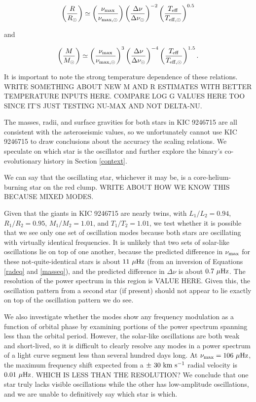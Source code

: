 \begin{equation}
\left( \frac{R}{R_\odot} \right) \simeq \left( \frac{\nu_{\rm{max}}}{\nu_{\rm{max,\odot}}} \right) \left( \frac{\Delta \nu}{\Delta \nu_\odot} \right)^{-2} \left( \frac{T_{\rm{eff}}}{T_{\rm{eff,\odot}}} \right)^{0.5}
\label{radeq}
\end{equation}

and

\begin{equation}
\left( \frac{M}{M_\odot} \right) \simeq {\left( \frac{\nu_{\rm{max}}}{\nu_{\rm{max,\odot}}} \right)}^{3} \left( \frac{\Delta \nu}{\Delta \nu_\odot} \right)^{-4} \left( \frac {T_{\rm{eff}}} {T_{\rm{eff,\odot}}} \right)^{1.5}.
\label{masseq}
\end{equation}

It is important to note the strong temperature dependence of these relations. WRITE SOMETHING ABOUT NEW M AND R ESTIMATES WITH BETTER TEMPERATURE INPUTS HERE. COMPARE LOG G VALUES HERE TOO SINCE IT'S JUST TESTING NU-MAX AND NOT DELTA-NU.

The masses, radii, and surface gravities for both stars in KIC 9246715 are all consistent with the asteroseismic values, so we unfortunately cannot use KIC 9246715 to draw conclusions about the accuracy the scaling relations. We speculate on which star is the oscillator and further explore the binary's co-evolutionary history in Section \ref{context}.

We can say that the oscillating star, whichever it may be, is a core-helium-burning star on the red clump. WRITE ABOUT HOW WE KNOW THIS BECAUSE MIXED MODES. 

Given that the giants in KIC 9246715 are nearly twins, with $L_1/L_2 = 0.94$, $R_1/R_2 = 0.95$, $M_1/M_2 = 1.01$, and $T_1/T_2 = 1.01$, we test whether it is possible that we see only one set of oscillation modes because both stars are oscillating with virtually identical frequencies. It is unlikely that two sets of solar-like oscillations lie on top of one another, because the predicted difference in $\nu_{\rm{max}}$ for these not-quite-identical stars is about $11 \ \mu \rm{Hz}$ (from an inversion of Equations \ref{radeq} and \ref{masseq}), and the predicted difference in $\Delta \nu$ is about $0.7 \ \mu \rm{Hz}$. The resolution of the power spectrum in this region is VALUE HERE. Given this, the oscillation pattern from a second star (if present) should not appear to lie exactly on top of the oscillation pattern we do see.

We also investigate whether the modes show any frequency modulation as a function of orbital phase by examining portions of the power spectrum spanning less than the orbital period. However, the solar-like oscillations are both weak and short-lived, so it is difficult to clearly resolve any modes in a power spectrum of a light curve segment less than several hundred days long. At $\nu_{\rm{max}} = 106 \ \mu \rm{Hz}$, the maximum frequency shift expected from a $\pm \ 30 \ \rm{km} \ \rm{s}^{-1}$ radial velocity is $0.01 \ \mu \rm{Hz}$. WHICH IS LESS THAN THE RESOLUTION? We conclude that one star truly lacks visible oscillations while the other has low-amplitude oscillations, and we are unable to definitively say which star is which.